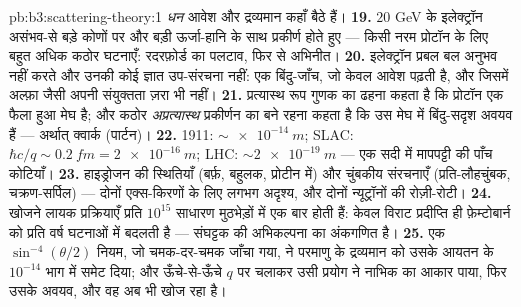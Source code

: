 \begin{solution}{pb:b3:scattering-theory:1}
\emph{धन} आवेश और द्रव्यमान कहाँ बैठे हैं।
\textbf{19.} $20$ \unit{GeV} के इलेक्ट्रॉन असंभव-से बड़े कोणों पर
और बड़ी ऊर्जा-हानि के साथ प्रकीर्ण होते हुए --- किसी नरम प्रोटॉन के
लिए बहुत अधिक कठोर घटनाएँ: रदरफ़ोर्ड का पलटाव, फिर से अभिनीत।
\textbf{20.} इलेक्ट्रॉन प्रबल बल अनुभव नहीं करते और उनकी कोई ज्ञात
उप-संरचना नहीं: एक बिंदु-जाँच, जो केवल आवेश पढ़ती है, और जिसमें
अल्फ़ा जैसी अपनी संयुक्तता ज़रा भी नहीं।
\textbf{21.} प्रत्यास्थ रूप गुणक का ढहना कहता है कि प्रोटॉन एक
फैला हुआ मेघ है; और कठोर \emph{अप्रत्यास्थ} प्रकीर्णन का बने रहना
कहता है कि उस मेघ में बिंदु-सदृश अवयव हैं ---
अर्थात् क्वार्क (पार्टन)।
\textbf{22.} 1911: $\sim\qty{e-14}{m}$; SLAC: $\hbar c/q \sim
\qty{0.2}{fm} = \qty{2e-16}{m}$; LHC: $\sim\qty{2e-19}{m}$ ---
एक सदी में मापपट्टी की पाँच कोटियाँ।
\textbf{23.} हाइड्रोजन की स्थितियाँ (बर्फ़, बहुलक, प्रोटीन में) और
चुंबकीय संरचनाएँ (प्रति-लौहचुंबक, चक्रण-सर्पिल) --- दोनों
एक्स-किरणों के लिए लगभग अदृश्य, और दोनों न्यूट्रॉनों की रोज़ी-रोटी।
\textbf{24.} खोजने लायक प्रक्रियाएँ प्रति
$10^{15}$ साधारण मुठभेड़ों में एक बार होती हैं: केवल विराट प्रदीप्ति
ही फ़ेम्टोबार्न को प्रति वर्ष घटनाओं में बदलती है --- संघट्टक की
अभिकल्पना  का अंकगणित है।
\textbf{25.} एक $\sin^{-4}(\theta/2)$ नियम, जो चमक-दर-चमक जाँचा
गया, ने परमाणु के द्रव्यमान को उसके आयतन के $10^{-14}$ भाग में समेट
दिया; और ऊँचे-से-ऊँचे $q$ पर चलाकर उसी प्रयोग ने नाभिक का आकार पाया,
फिर उसके अवयव, और वह अब भी खोज रहा है।
\end{solution}

